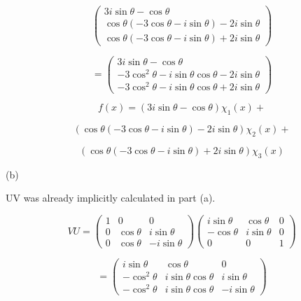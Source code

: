 \documentclass[12pt]{article}
\begin{document}
\[
    \begin{pmatrix}
        3 i \sin \theta - \cos \theta                                \\
        \cos \theta (-3 \cos \theta - i \sin \theta) - 2i\sin \theta \\
        \cos \theta (-3 \cos \theta - i \sin \theta) + 2i\sin \theta
    \end{pmatrix}
\]

\[
    = \begin{pmatrix}
        3 i \sin \theta - \cos \theta                                \\
        -3 \cos^2 \theta - i \sin \theta \cos \theta - 2i\sin \theta \\
        -3 \cos^2 \theta - i \sin \theta \cos \theta + 2i\sin \theta
    \end{pmatrix}
\]

\[
    f(x) = \left(3 i \sin \theta - \cos \theta\right) \chi_1(x) +
\]

\[
    \left(\cos \theta (-3 \cos \theta - i \sin \theta) - 2i\sin \theta\right) \chi_2(x) +
\]

\[
    \left(\cos \theta (-3 \cos \theta - i \sin \theta) + 2i\sin \theta\right) \chi_3(x)
\]

(b)

UV was already implicitly calculated in part (a).

\[
    VU = \begin{pmatrix}
        1 & 0           & 0              \\
        0 & \cos \theta & i \sin \theta  \\
        0 & \cos \theta & -i \sin \theta
    \end{pmatrix}
    \begin{pmatrix}
        i \sin \theta & \cos \theta   & 0 \\
        -\cos \theta  & i \sin \theta & 0 \\
        0             & 0             & 1
    \end{pmatrix}
\]

\[
    = \begin{pmatrix}
        i \sin \theta  & \cos \theta               & 0              \\
        -\cos^2 \theta & i \sin \theta \cos \theta & i \sin \theta  \\
        -\cos^2 \theta & i \sin \theta \cos \theta & -i \sin \theta
    \end{pmatrix}
\]
\end{document}
